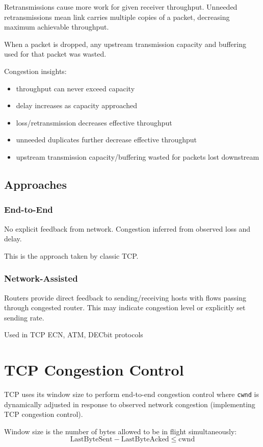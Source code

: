\documentclass[11pt]{article}
\begin{document}
Retransmissions cause more work for given receiver throughput.
Unneeded retransmissions mean link carries multiple copies of a packet, decreasing maximum achievable
throughput.

When a packet is dropped, any upstream transmission capacity and buffering used for that packet
was wasted.

Congestion insights:
\begin{itemize}
\item throughput can never exceed capacity
\item delay increases as capacity approached
\item loss/retransmission decreases effective throughput
\item unneeded duplicates further decrease effective throughput
\item upstream transmission capacity/buffering wasted for packets lost downstream
\end{itemize}
\subsection{Approaches}
\label{sec:orgb2a71ab}
\subsubsection{End-to-End}
\label{sec:org59b5b62}
No explicit feedback from network.
Congestion inferred from observed loss and delay.

This is the approach taken by classic TCP.
\subsubsection{Network-Assisted}
\label{sec:org1405859}
Routers provide direct feedback to sending/receiving hosts with flows passing through congested router.
This may indicate congestion level or explicitly set sending rate.

Used in TCP ECN, ATM, DECbit protocols
\section{TCP Congestion Control}
\label{sec:orgd23e6c2}
TCP uses its window size to perform end-to-end congestion control where \texttt{cwnd} is dynamically
adjusted in response to observed network congestion (implementing TCP congestion control).

Window size is the number of bytes allowed to be in flight simultaneously:
$$ \text{LastByteSent} - \text{LastByteAcked} \le \text{cwnd} $$
\end{document}
